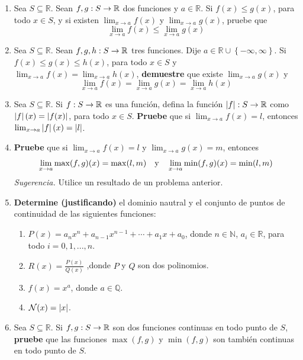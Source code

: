 \documentclass[12pt]{article}
\begin{document}
\begin{enumerate}
    \item Sea $S\subseteq\mathbb{R}$. Sean $f,g:S\rightarrow\mathbb{R}$ dos funciones y $a\in\mathbb{R}$. Si $f(x)\leq g(x)$, para todo $x\in S$, y si existen $\lim_{ x\rightarrow a}f(x)$ y $\lim_{ x\rightarrow a}g(x)$, pruebe que
    \begin{equation*}
        \lim_{ x\rightarrow a}f(x)\leq\lim_{ x\rightarrow a}g(x)
    \end{equation*}
    \item Sea $S\subseteq\mathbb{R}$. Sean $f,g,h:S\rightarrow\mathbb{R}$ tres funciones. Dije $a\in\mathbb{R}\cup\left\{-\infty,\infty \right\}$. Si $f(x)\leq g(x)\leq h(x)$, para todo $x\in S$ y $\lim_{ x\rightarrow a}f(x)=\lim_{ x\rightarrow a}h(x)$, \textbf{demuestre} que existe $\lim_{ x\rightarrow a}g(x)$ y
    \begin{equation*}
        \lim_{ x\rightarrow a}f(x)=\lim_{ x\rightarrow a}g(x)=\lim_{ x\rightarrow a}h(x)
    \end{equation*}
    \item Sea $S\subseteq\mathbb{R}$. Si $f:S\rightarrow\mathbb{R}$ es una función, defina la función $\left| f \right|:S\rightarrow\mathbb{R}$ como $\left| f \right|(x)=\left| f(x) \right|$, para todo $x\in S$. \textbf{Pruebe} que si $\lim_{ x\rightarrow a}f(x)=l$, entonces $\lim_{ x\rightarrow a}\left| f \right|(x)=\left| l \right|$.
    \item \textbf{Pruebe} que si $\lim_{ x\rightarrow a}f(x)=l$ y $\lim_{ x\rightarrow a}g(x)=m$, entonces
    \begin{equation*}
        \lim_{ x\rightarrow a}\max(f,g)(x)=\max(l,m)\quad\textup{y}\quad\lim_{ x\rightarrow a}\min(f,g)(x)=\min(l,m)
    \end{equation*}
    \textit{Sugerencia.} Utilice un resultado de un problema anterior.
    \item \textbf{Determine (justificando)} el dominio nautral y el conjunto de puntos de continuidad de las siguientes funciones:
    \begin{enumerate}
        \item $P(x)=a_nx^n+a_{ n-1}x^{ n-1}+\cdots+a_1x+a_0$, donde $n\in\mathbb{N}$, $a_i\in\mathbb{R}$, para todo $i=0,1,...,n$.
        \item $R(x)=\frac{P(x)}{Q(x)}$ ,donde $P$ y $Q$ son dos polinomios.
        \item $f(x)=x^a$, donde $a\in\mathbb{Q}$.
        \item $\mathcal{N}(x)=\left| x \right|$.
    \end{enumerate}
    \item Sea $S\subseteq\mathbb{R}$. Si $f,g:S\rightarrow\mathbb{R}$ son dos funciones continuas en todo punto de $S$, \textbf{pruebe} que las funciones $\max(f,g)$ y $\min(f,g)$ son también continuas en todo punto de $S$.

\end{enumerate}
\end{document}
